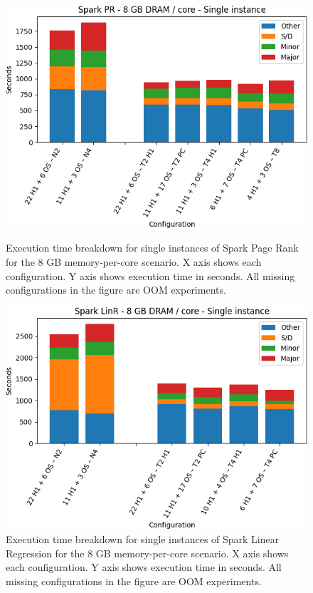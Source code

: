 \begin{figure}[thbp]
\centering
    \includegraphics[width=\linewidth]{./fig/pr64_single.png}
    \caption{ Execution time breakdown for single instances of Spark
	Page Rank for the 8 GB memory-per-core scenario. X axis shows each configuration. Y axis shows execution time in seconds. All missing configurations in the figure are OOM experiments.}
    \label{fig:pr64_single}
	\includegraphics[width=\linewidth]{./fig/linr64_single.png}
    \caption{Execution time breakdown for single instances of Spark
	Linear Regression for the 8 GB memory-per-core scenario. X axis shows each configuration. Y axis shows execution time in seconds. All missing configurations in the figure are OOM experiments.}
    \label{fig:linr64_single}
\end{figure}

